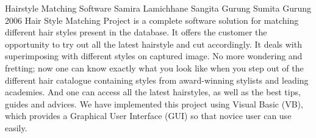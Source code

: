  \begin{conf-abstract}[]
 {Hairstyle Matching Software}
{
Samira Lamichhane 
Sangita Gurung
Sumita Gurung
}
{2006}
            Hair Style Matching Project is a complete software solution for matching different hair styles present in
the database. It offers the customer the opportunity to try out all the latest hairstyle and cut accordingly. It deals
with superimposing with different styles on captured image. No more wondering and fretting; now one can know exactly what 
you look like when you step out of the different hair catalogue containing styles from award-winning stylists and leading 
academies. And one can access all the latest hairstyles, as well as the best tips, guides and advices. We have 
implemented this project using Visual Basic (VB), which provides a Graphical User Interface (GUI) so that novice user can
use easily.  
  \end{conf-abstract}